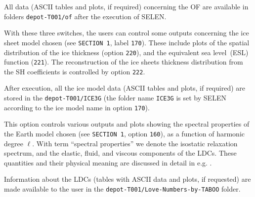\documentclass[11pt,fleqn,a4paper,titlepage]{article}
\newcommand\selen{\textsf{SELEN~}}
\newcommand\selens{\textsf{SELEN}}
\newcommand\sealevel{sea level~}
\begin{document}
All data (ASCII tables and plots, if required) concerning the OF are available in folders \texttt{depot-T001/of} after the execution of \selens. 

\vspace{0.4cm}

{\color{Magenta}{\scriptsize\begin{verbatim}
    ...
    ====> ICE MODEL ---------------------------------------------------------------
    220    Maps of original ice sheets  (y/n)                	      'y' 
    221    Plot of Equivalent Sea Level (ESL)  (y/n)       		     'y' 
    222    Reconstruction & mapping of the ice sheets (y/n)  	    'n'
    ...
\end{verbatim} }}
\noindent With these three switches, the users can control some outputs concerning the ice 
sheet model chosen (see \texttt{SECTION 1}, label \texttt{170}). These include plots of 
the spatial distribution of the ice thickness (option \texttt{220}), and the 
equivalent \sealevel (ESL) function (\texttt{221}). The reconstruction of the ice sheets 
thickness distribution from the SH coefficients is controlled by option \texttt{222}. 

After execution, all the ice model data (ASCII tables and plots, if required) 
are stored in the \texttt{depot-T001/ICE3G} (the folder name \texttt{ICE3G} is set by \selen 
according to the ice model name in option \texttt{170}).   

\vspace{0.4cm}

{\color{Magenta}{\scriptsize\begin{verbatim}
    ...
    ====> EARTH MODEL SPECTRAL PROPERTIES -----------------------------------------
    230    Plot LDCs, relaxation spectrum & residues for normal modes  (y/n)   'y'      
    ...
\end{verbatim} }}
\noindent This option controls various outputs and plots showing the spectral properties 
of the Earth model chosen (see \texttt{SECTION 1}, option \texttt{160}), as a function of harmonic degree $\ell$. 
With term ``spectral properties'' we denote the isostatic relaxation spectrum, and the 
elastic, fluid, and viscous components of the LDCs. These quantities and their physical meaning 
are discussed in detail in e.g. \citet{Spada_etal_2011}. 

Information about the LDCs (tables with ASCII data and plots, if 
requested) are made available to the user in the \texttt{depot-T001/Love-Numbers-by-TABOO} folder.
\end{document}
